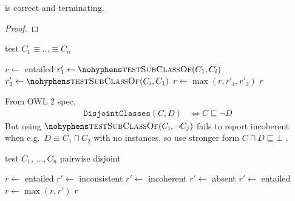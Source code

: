 \documentclass[paper.tex]{subfiles}
\begin{document}
\begin{theorem}
   is correct and terminating.
\end{theorem}
\begin{proof}
\end{proof}

\begin{algorithm}[H]
  \caption{test $C_1 \equiv \ldots \equiv C_n$}
  \begin{algorithmic}[1]
    \raggedright
      \State $r \gets$ entailed
        \State $r'_1 \gets \Call{testSubClassOf}{C_1, C_i}$
        \State $r'_2 \gets \Call{testSubClassOf}{C_i, C_1}$
        \State $r \gets \max(r, r'_1, r'_2)$
      \EndFor
      \State \Return $r$
    \EndFunction
  \end{algorithmic}
\end{algorithm}


From OWL 2 spec,
\begin{align*}
  \mathtt{DisjointClasses}(C, D)
  &\iff C \sqsubseteq \neg D
\end{align*}
But using $\textproc{testSubClassOf}(C_i, \neg C_j)$ fails to report incoherent when e.g.\ $D \equiv C_1 \sqcap C_2$ with no instances, so use stronger form $C \sqcap D \sqsubseteq \bot$ .

\begin{algorithm}[H]
  \caption{test $C_1, \,\ldots, C_n$ pairwise disjoint}
  \begin{algorithmic}[1]
    \raggedright
      \State $r \gets$ entailed
            \State $r' \gets$ inconsistent
            \State $r' \gets$ incoherent
            \State $r' \gets$ absent
          \Else
            \State $r' \gets$ entailed
          \EndIf
          \State $r \gets \max(r, r')$
        \EndFor
      \EndFor
      \State \Return $r$
    \EndFunction
  \end{algorithmic}
\end{algorithm}
\end{document}
